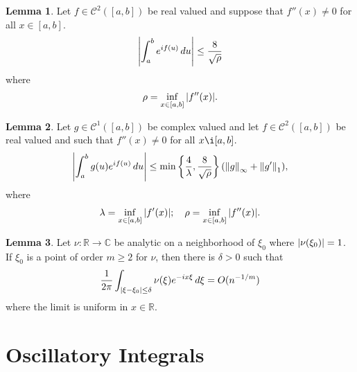 \documentclass{article}
\theoremstyle{definition}
\newtheorem{lemma}{Lemma}[section]
\newcommand{\f}[2]{\frac{#1}{#2}}
\newcommand{\lc}{\left\{}
\newcommand{\rc}{\right\}}
\begin{document}
\begin{lemma}
	Let $f\in \mathcal{C}^2([a,b])$ be real valued and suppose that $f''(x)\neq 0$ for all $x\in [a,b]$.
	\begin{align}
	\abs{\int^b_a e^{if(u)}\,du} \leq \f{8}{\sqrt{\rho}}
	\end{align}
	where
	\begin{align}
	\rho = \inf_{x\in [a,b]}\abs{f''(x)}.
	\end{align}
\end{lemma}


\begin{lemma}
	Let $g\in \mathcal{C}^1([a,b])$ be complex valued and let $f\in \mathcal{C}^2([a,b])$ be real valued and such that $f''(x) \neq 0$ for all $x\i [a,b]$.
	\begin{align}
	\abs{\int^b_a g(u)e^{if(u)}\,du}\leq \min\lc \f{4}{\lambda}, \f{8}{\sqrt{\rho}} \rc(\norm{g}_\infty + \norm{g'}_1),
	\end{align}
	where
	\begin{align}
	\lambda = \inf_{x\in [a,b]}\abs{f'(x)};\quad \rho = \inf_{x\in[a,b]}\abs{f''(x)}.
	\end{align}
\end{lemma}


\begin{lemma}
	Let $\nu : \mathbb{R} \to \mathbb{C}$ be analytic on a neighborhood of $\xi_0$ where $\abs{\nu(\xi_0)} = 1$. If $\xi_0$ is a point of order $m \geq 2$ for $\nu$, then there is $\delta > 0$ such that
	\begin{align}
	\f{1}{2\pi}\int_{\abs{\xi - \xi_0} \leq \delta} \nu(\xi)e^{-ix\xi}\,d\xi = O(n^{-1/m})
	\end{align}
	where the limit is uniform in $x\in \mathbb{R}$.
\end{lemma}




\section{Oscillatory Integrals}















	
	
	
\end{document}
